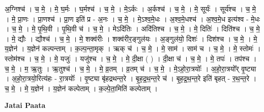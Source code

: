 \documentclass[17pt]{extarticle}
\begin{document}
अ॒ग्निश्च॑ । च॒ मे॒ । मे॒ घ॒र्मः । घ॒र्मश्च॑ । च॒ मे॒ । मे॒ऽर्कः । अ॒र्कश्च॑ । च॒ मे॒ । मे॒ सूर्यः॑ । सूर्य॑श्च । च॒ मे॒ । मे॒ प्रा॒णः । प्रा॒णश्च॑ । प्रा॒॒ण इति॑ प्र - अ॒नः । च॒ मे॒ । मे॒ऽश्व॒मे॒धः । अ॒श्व॒मे॒धश्च॑ । अ॒श्व॒मे॒ध इत्य॑श्व - मे॒धः । च॒ मे॒ । मे॒ पृ॒थि॒वी । पृ॒थि॒वी च॑ । च॒ मे॒ । मेऽदि॑तिः । अदि॑तिश्च । च॒ मे॒ । मे॒ दितिः॑ । दिति॑श्च । च॒ मे॒ । मे॒ द्यौः । द्यौश्च॑ । च॒ मे॒ । मे॒ शक्व॑रीः । शक्व॑रीर॒ङ्गुल॑यः । अ॒ङ्गुल॑यो॒ दिशः॑ । दिश॑श्च । च॒ मे॒ । मे॒ य॒ज्ञेन॑ । य॒ज्ञेन॑ कल्पन्ताम् । क॒ल्प॒न्ता॒मृक् । ऋक् च॑ । च॒ मे॒ । मे॒ साम॑ । साम॑ च । च॒ मे॒ । मे॒ स्तोमः॑ । स्तोम॑श्च । च॒ मे॒ । मे॒ यजुः॑ । यजु॑श्च । च॒ मे॒ । मे॒ दी॒क्षा ( ) । दी॒क्षा च॑ । च॒ मे॒ । मे॒ तपः॑ । तप॑श्च । च॒ मे॒ । म॒ ऋ॒तुः । ऋ॒तुश्च॑ । च॒ मे॒ । 
मे॒ व्र॒तम् । व्र॒तम् च॑ । च॒ मे॒ । मे॒ऽहो॒रा॒त्रयोः᳚ । अ॒हो॒रा॒त्रयो᳚र् वृ॒ष्ट्या । अ॒हो॒रा॒त्रयो॒रित्य॑हः - रा॒त्रयोः᳚ । वृ॒ष्ट्या बृ॑हद्रथन्त॒रे । बृ॒ह॒द्र॒थ॒न्त॒रे च॑ । बृ॒ह॒द्र॒थ॒न्त॒रे इति॑ बृहत् - र॒थ॒न्त॒रे । च॒ मे॒ । मे॒ य॒ज्ञेन॑ । य॒ज्ञेन॑ कल्पेताम् । क॒ल्पे॒ता॒मिति॑ कल्पेताम् । \newline

\textbf{Jatai Paata} \newline
\end{document}
